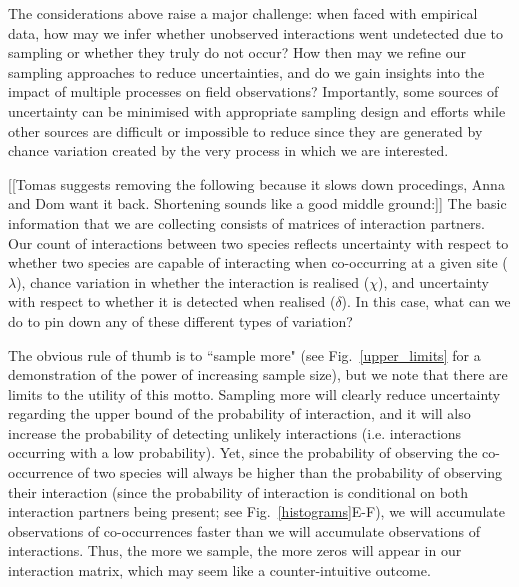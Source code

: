 \documentclass[12pt]{article}
\begin{document}
\begin{spacing}{2.0}
    The considerations above raise a major challenge: when faced with empirical data, how may we infer whether unobserved interactions went undetected due to sampling or whether they truly do not occur? How then may we refine our sampling approaches to reduce uncertainties, and do we gain insights into the impact of multiple processes on field observations? Importantly, some sources of uncertainty can be minimised with appropriate sampling design and efforts while other sources are difficult or impossible to reduce since they are generated by chance variation created by the very process in which we are interested.



  [[Tomas suggests removing the following because it slows down procedings, Anna and Dom want it back. Shortening sounds like a good middle ground:]]
  The basic information that we are collecting consists of matrices of interaction partners. Our count of interactions between two species reflects uncertainty with respect to whether two species are capable of interacting when co-occurring at a given site ($\lambda$), chance variation in whether the interaction is realised ($\chi$),  and uncertainty with respect to whether it is detected when realised ($\delta$). In this case, what can we do to pin down any of these different types of variation?


  The obvious rule of thumb is to ``sample more" (see Fig.~\ref{upper_limits} for a demonstration of the power of increasing sample size), but we note that there are limits to the utility of this motto. Sampling more will clearly reduce uncertainty regarding the upper bound of the probability of interaction, and it will also increase the probability of detecting unlikely interactions (i.e. interactions occurring with a low probability). Yet, since the probability of observing the co-occurrence of two species will always be higher than the probability of observing their interaction (since the probability of interaction is conditional on both interaction partners being present; see Fig.~\ref{histograms}E-F), we will accumulate observations of co-occurrences faster than we will accumulate observations of interactions. Thus, the more we sample, the more zeros will appear in our interaction matrix, which may seem like a counter-intuitive outcome. 



\end{spacing}
\end{document}
